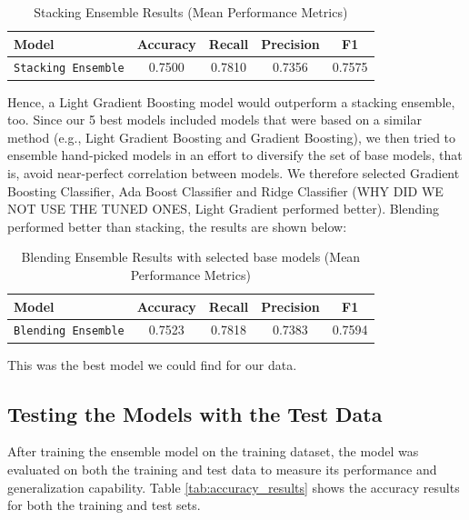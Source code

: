 \documentclass[a4paper,12pt]{article}
\begin{document}
\begin{table}[H]
    \centering
    \begin{tabular}{l c c c c}
    \toprule
    \textbf{Model} & \textbf{Accuracy} & \textbf{Recall} & \textbf{Precision} & \textbf{F1} \\
    \midrule
    \texttt{Stacking Ensemble} & 0.7500 & 0.7810 & 0.7356 & 0.7575 \\
    \bottomrule
    \end{tabular}
    \caption{Stacking Ensemble Results (Mean Performance Metrics)}
    \label{tab:stacking_performance}
\end{table}
    
Hence, a Light Gradient Boosting model would outperform a stacking ensemble, too.
Since our 5 best models included models that were based on a similar method (e.g., Light Gradient Boosting 
and Gradient Boosting), we then tried to ensemble hand-picked models in an effort to diversify the set of
base models, that is, avoid near-perfect correlation between models. We therefore selected Gradient Boosting Classifier, 
Ada Boost Classifier and Ridge Classifier (WHY DID WE NOT USE THE TUNED ONES, Light Gradient performed better).
Blending performed better than stacking, the results are shown below:

\begin{table}[H]
    \centering
    \begin{tabular}{l c c c c}
    \toprule
    \textbf{Model} & \textbf{Accuracy} & \textbf{Recall} & \textbf{Precision} & \textbf{F1} \\
    \midrule
    \texttt{Blending Ensemble} & 0.7523 & 0.7818 & 0.7383 & 0.7594 \\
    \bottomrule
    \end{tabular}
    \caption{Blending Ensemble Results with selected base models (Mean Performance Metrics)}
    \label{tab:blending_performance_handpicked}
\end{table}

This was the best model we could find for our data.


\subsection{Testing the Models with the Test Data}

After training the ensemble model on the training dataset, the model was evaluated on both the 
training and test data to measure its performance and generalization capability. 
Table \ref{tab:accuracy_results} shows the accuracy results for both the training and test sets.
\end{document}
